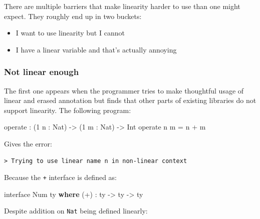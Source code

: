 \documentclass[
]{article}
\newenvironment{Shaded}{}{}
\newcommand{\DataTypeTok}[1]{\textcolor[rgb]{0.56,0.13,0.00}{#1}}
\newcommand{\DecValTok}[1]{\textcolor[rgb]{0.25,0.63,0.44}{#1}}
\newcommand{\KeywordTok}[1]{\textcolor[rgb]{0.00,0.44,0.13}{\textbf{#1}}}
\newcommand{\NormalTok}[1]{#1}
\newcommand{\OperatorTok}[1]{\textcolor[rgb]{0.40,0.40,0.40}{#1}}
\newcommand{\OtherTok}[1]{\textcolor[rgb]{0.00,0.44,0.13}{#1}}
\providecommand{\tightlist}{%
  \setlength{\itemsep}{0pt}\setlength{\parskip}{0pt}}
\begin{document}
There are multiple barriers that make linearity harder to use than one
might expect. They roughly end up in two buckets:

\begin{itemize}
\tightlist
\item
  I want to use linearity but I cannot
\item
  I have a linear variable and that's actually annoying
\end{itemize}

\hypertarget{not-linear-enough}{%
\subsubsection{Not linear enough}\label{not-linear-enough}}

The first one appears when the programmer tries to make thoughtful usage
of linear and erased annotation but finds that other parts of existing
libraries do not support linearity. The following program:

\begin{Shaded}
\begin{Highlighting}[]
\NormalTok{operate }\OperatorTok{:}\NormalTok{ (}\DecValTok{1}\NormalTok{ n }\OperatorTok{:} \DataTypeTok{Nat}\NormalTok{) }\OtherTok{{-}\textgreater{}}\NormalTok{ (}\DecValTok{1}\NormalTok{ m }\OperatorTok{:} \DataTypeTok{Nat}\NormalTok{) }\OtherTok{{-}\textgreater{}} \DataTypeTok{Int}
\NormalTok{operate n m }\OtherTok{=}\NormalTok{ n }\OperatorTok{+}\NormalTok{ m}
\end{Highlighting}
\end{Shaded}

Gives the error:

\begin{verbatim}
> Trying to use linear name n in non-linear context
\end{verbatim}

Because the \texttt{+} interface is defined as:

\begin{Shaded}
\begin{Highlighting}[]
\NormalTok{interface }\DataTypeTok{Num}\NormalTok{ ty }\KeywordTok{where}
\NormalTok{    (}\OperatorTok{+}\NormalTok{) }\OperatorTok{:}\NormalTok{ ty }\OtherTok{{-}\textgreater{}}\NormalTok{ ty }\OtherTok{{-}\textgreater{}}\NormalTok{ ty}
\end{Highlighting}
\end{Shaded}

Despite addition on \texttt{Nat} being defined linearly:
\end{document}
